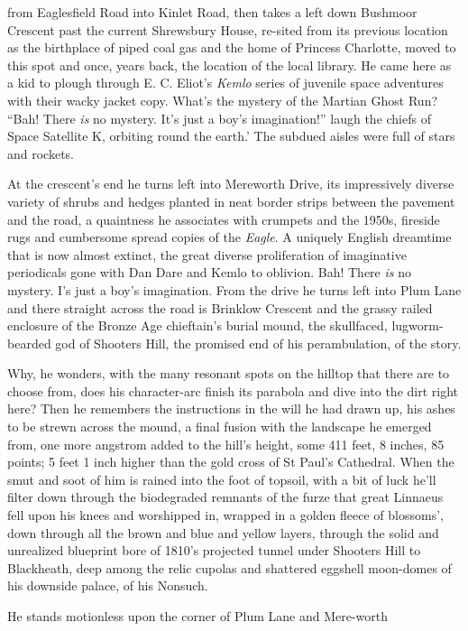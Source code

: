 \documentclass[
]{article}
\begin{document}
from Eaglesfield Road into Kinlet Road, then takes a left down Bushmoor
Crescent past the current Shrewsbury House, re-sited from its previous
location as the birthplace of piped coal gas and the home of Princess
Charlotte, moved to this spot and once, years back, the location of the
local library. He came here as a kid to plough through E. C. Eliot's
\emph{Kemlo} series of juvenile space adventures with their wacky jacket
copy. What's the mystery of the Martian Ghost Run? ``Bah! There
\emph{is} no mystery. It's just a boy's imagination!'' laugh the chiefs
of Space Satellite K, orbiting round the earth.' The subdued aisles were
full of stars and rockets. \par
At the crescent's end he turns left into Mereworth Drive, its
impressively diverse variety of shrubs and hedges planted in neat border
strips between the pavement and the road, a quaintness he associates
with crumpets and the 1950s, fireside rugs and cumbersome spread copies
of the \emph{Eagle}. A uniquely English dreamtime that is now almost
extinct, the great diverse proliferation of imaginative periodicals gone
with Dan Dare and Kemlo to oblivion. Bah! There \emph{is} no mystery.
I's just a boy's imagination. From the drive he turns left into Plum
Lane and there straight across the road is Brinklow Crescent and the
grassy railed enclosure of the Bronze Age chieftain's burial mound, the
skullfaced, lugworm-bearded god of Shooters Hill, the promised end of
his perambulation, of the story. \par
Why, he wonders, with the many resonant spots on the hilltop that
there are to choose from, does his character-arc finish its parabola and
dive into the dirt right here? Then he remembers the instructions in the
will he had drawn up, his ashes to be strewn across the mound, a final
fusion with the landscape he emerged from, one more angstrom added to
the hill's height, some 411 feet, 8 inches, 85 points; 5 feet 1 inch
higher than the gold cross of St Paul's Cathedral. When the smut and
soot of him is rained into the foot of topsoil, with a bit of luck he'll
filter down through the biodegraded remnants of the furze that great
Linnaeus fell upon his knees and worshipped in, wrapped in a golden
fleece of blossoms', down through all the brown and blue and yellow
layers, through the solid and unrealized blueprint bore of 1810's
projected tunnel under Shooters Hill to Blackheath, deep among the relic
cupolas and shattered eggshell moon-domes of his downside palace, of his
Nonsuch. \par
He stands motionless upon the corner of Plum Lane and Mere-worth
\end{document}
